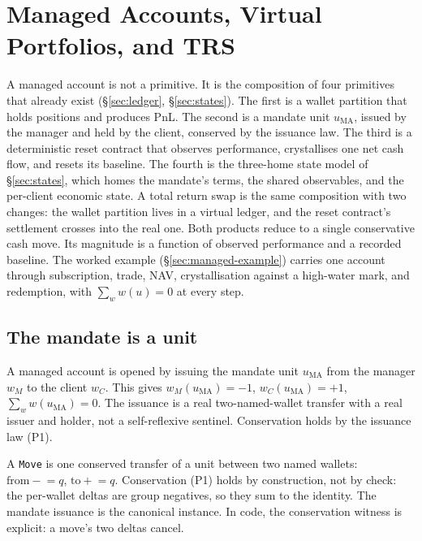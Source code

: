 \section{Managed Accounts, Virtual Portfolios, and TRS}
\label{sec:managed}

A managed account is not a primitive. It is the composition of four primitives that already
exist (\S\ref{sec:ledger}, \S\ref{sec:states}). The first is a wallet partition that holds
positions and produces PnL. The second is a mandate unit $u_{\mathrm{MA}}$, issued by the
manager and held by the client, conserved by the issuance law. The third is a deterministic
reset contract that observes performance, crystallises one net cash flow, and resets its
baseline. The fourth is the three-home state model of \S\ref{sec:states}, which homes the
mandate's terms, the shared observables, and the per-client economic state. A total return
swap is the same composition with two changes: the wallet partition lives in a virtual
ledger, and the reset contract's settlement crosses into the real one. Both products reduce
to a single conservative cash move. Its magnitude is a function of observed performance and
a recorded baseline. The worked example (\S\ref{sec:managed-example}) carries one account
through subscription, trade, NAV, crystallisation against a high-water mark, and redemption,
with $\sum_w w(u)=0$ at every step.

\subsection{The mandate is a unit}
\label{sec:managed-mandate}

A managed account is opened by issuing the mandate unit $u_{\mathrm{MA}}$ from the manager
$w_M$ to the client $w_C$. This gives $w_M(u_{\mathrm{MA}})=-1$, $w_C(u_{\mathrm{MA}})=+1$,
$\sum_w w(u_{\mathrm{MA}})=0$. The issuance is a real two-named-wallet transfer with a real
issuer and holder, not a self-reflexive sentinel. Conservation holds by the issuance law (P1).

A \texttt{Move} is one conserved transfer of a unit between two named wallets:
$\text{from}\mathbin{-}\!=q$, $\text{to}\mathbin{+}\!=q$. Conservation (P1) holds by
construction, not by check: the per-wallet deltas are group negatives, so they sum to the
identity. The mandate issuance is the canonical instance. In code, the conservation witness
is explicit: a move's two deltas cancel.

